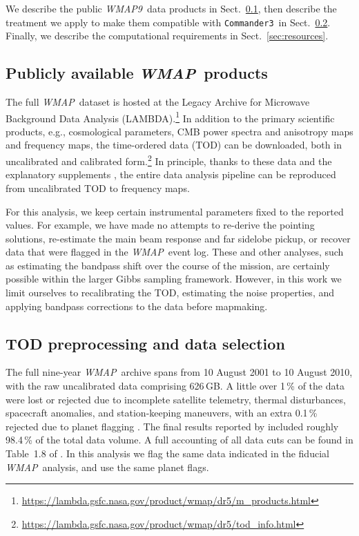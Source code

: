\documentclass[twocolumn]{../../common/aa}
\def\WMAP{\emph{WMAP}}
\def\WMAPnine{\emph{WMAP9}}
\def\commanderthree{\texttt{Commander3}}
\begin{document}
We describe the public \WMAPnine\ data products in Sect.~\ref{sec:products}, then describe the treatment we apply to make them compatible with \commanderthree\ in Sect.~\ref{sec:preprocessing}. Finally, we describe the computational requirements in Sect.~\ref{sec:resources}.


\subsection{Publicly available \WMAP\ products}
\label{sec:products}

The full \WMAP\ dataset is hosted at the Legacy Archive for Microwave Background Data Analysis (LAMBDA).\footnote{\url{https://lambda.gsfc.nasa.gov/product/wmap/dr5/m_products.html}} In addition to the primary scientific products, e.g., cosmological parameters, CMB power spectra and anisotropy maps and frequency maps, the time-ordered data (TOD) can be downloaded, both in uncalibrated and calibrated form.\footnote{\url{https://lambda.gsfc.nasa.gov/product/wmap/dr5/tod_info.html}} In principle, thanks to these data and the explanatory supplements \citep{wmapexsupp}, the entire data analysis pipeline can be reproduced from uncalibrated TOD to frequency maps.

For this analysis, we keep certain instrumental parameters fixed to the reported values. For example, we have made no attempts to re-derive the pointing solutions, re-estimate the main beam response and far sidelobe pickup, or recover data that were flagged in the \WMAP\ event log. These and other analyses, such as estimating the bandpass shift over the course of the mission, are certainly possible within the larger Gibbs sampling framework. However, in this work we limit ourselves to recalibrating the TOD, estimating the noise properties, and applying bandpass corrections to the data before mapmaking.

\subsection{TOD preprocessing and data selection}
\label{sec:preprocessing}


The full nine-year \WMAP\ archive spans from 10 August 2001 to 10 August 2010, with the raw uncalibrated data comprising 626\,GB. A little over 1\,\% of the data were lost or rejected due to incomplete satellite telemetry, thermal disturbances, spacecraft anomalies, and station-keeping maneuvers, with an extra 0.1\,\% rejected due to planet flagging \citep{bennett2003a,hinshaw2007,hinshaw2009,bennett2012}. 
The final results reported by \citet{bennett2012} included roughly 98.4\,\% of the total data volume.
A full accounting of all data cuts can be found in Table~1.8 of \citet{wmapexsupp}. In this analysis we flag the same data indicated in the fiducial \WMAP\ analysis, and use the same planet flags.
\end{document}
